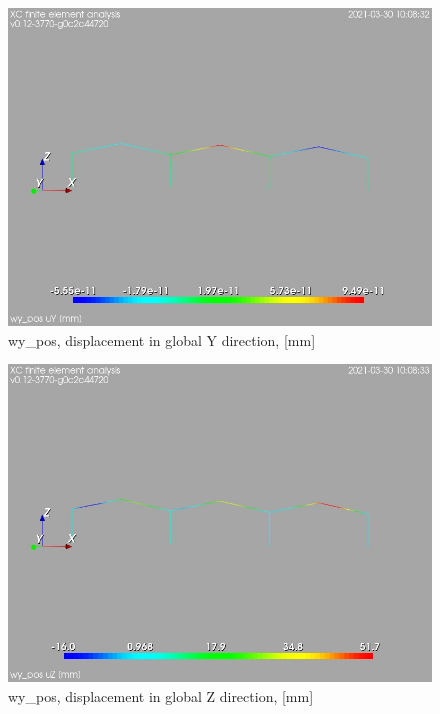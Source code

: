 \begin{figure}
\begin{center}
\includegraphics[width=\linewidth]{calc_results/sole_zeinali/text/graphics/resSimplLC/wy_postotaluY}
\caption{wy_pos, displacement in global Y direction, [mm]}
\end{center}
\end{figure}
\begin{figure}
\begin{center}
\includegraphics[width=\linewidth]{calc_results/sole_zeinali/text/graphics/resSimplLC/wy_postotaluZ}
\caption{wy_pos, displacement in global Z direction, [mm]}
\end{center}
\end{figure}
